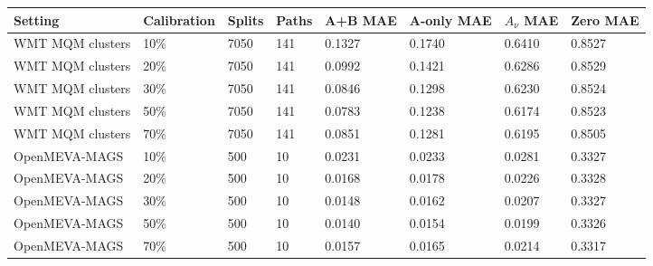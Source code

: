 \begin{tabular}{llllllll}
\toprule
Setting & Calibration & Splits & Paths & A+B MAE & A-only MAE & $A_\nu$ MAE & Zero MAE \\
\midrule
WMT MQM clusters & 10\% & 7050 & 141 & 0.1327 & 0.1740 & 0.6410 & 0.8527 \\
WMT MQM clusters & 20\% & 7050 & 141 & 0.0992 & 0.1421 & 0.6286 & 0.8529 \\
WMT MQM clusters & 30\% & 7050 & 141 & 0.0846 & 0.1298 & 0.6230 & 0.8524 \\
WMT MQM clusters & 50\% & 7050 & 141 & 0.0783 & 0.1238 & 0.6174 & 0.8523 \\
WMT MQM clusters & 70\% & 7050 & 141 & 0.0851 & 0.1281 & 0.6195 & 0.8505 \\
OpenMEVA-MAGS & 10\% & 500 & 10 & 0.0231 & 0.0233 & 0.0281 & 0.3327 \\
OpenMEVA-MAGS & 20\% & 500 & 10 & 0.0168 & 0.0178 & 0.0226 & 0.3328 \\
OpenMEVA-MAGS & 30\% & 500 & 10 & 0.0148 & 0.0162 & 0.0207 & 0.3327 \\
OpenMEVA-MAGS & 50\% & 500 & 10 & 0.0140 & 0.0154 & 0.0199 & 0.3326 \\
OpenMEVA-MAGS & 70\% & 500 & 10 & 0.0157 & 0.0165 & 0.0214 & 0.3317 \\
\bottomrule
\end{tabular}
